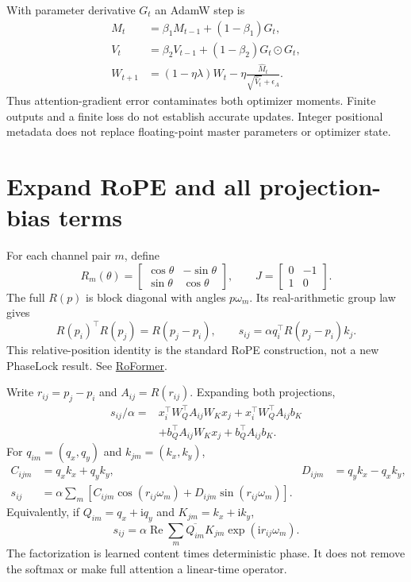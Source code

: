 \documentclass[11pt]{article}
\begin{document}
With parameter derivative $G_t$ an AdamW step is
\begin{align}
 M_t&=\beta_1 M_{t-1}+(1-\beta_1)G_t,\\
 V_t&=\beta_2 V_{t-1}+(1-\beta_2)G_t\odot G_t,\\
 W_{t+1}&=(1-\eta\lambda)W_t-
 \eta\frac{\widehat M_t}{\sqrt{\widehat V_t}+\epsilon_A}.
\end{align}
Thus attention-gradient error contaminates both optimizer moments. Finite outputs and a finite loss do not establish accurate updates. Integer positional metadata does not replace floating-point master parameters or optimizer state.

\section{Expand RoPE and all projection-bias terms}

For each channel pair $m$, define
\begin{equation}
 R_m(\theta)=\begin{bmatrix}\cos\theta&-\sin\theta\\\sin\theta&\cos\theta\end{bmatrix},
 \qquad J=\begin{bmatrix}0&-1\\1&0\end{bmatrix}.
\end{equation}
The full $R(p)$ is block diagonal with angles $p\omega_m$. Its real-arithmetic group law gives
\begin{equation}
 R(p_i)^\top R(p_j)=R(p_j-p_i),\qquad
 s_{ij}=\alpha q_i^\top R(p_j-p_i)k_j.
\end{equation}
This relative-position identity is the standard RoPE construction, not a new PhaseLock result. See \href{https://arxiv.org/html/2104.09864v5}{RoFormer}.

Write $r_{ij}=p_j-p_i$ and $A_{ij}=R(r_{ij})$. Expanding both projections,
\begin{align}
 s_{ij}/\alpha={}&x_i^\top W_Q^\top A_{ij}W_Kx_j
 +x_i^\top W_Q^\top A_{ij}b_K\\
 &+b_Q^\top A_{ij}W_Kx_j+b_Q^\top A_{ij}b_K.
\end{align}
For $q_{im}=(q_x,q_y)$ and $k_{jm}=(k_x,k_y)$,
\begin{align}
 C_{ijm}&=q_xk_x+q_yk_y,&D_{ijm}&=q_yk_x-q_xk_y,\\
 s_{ij}&=\alpha\sum_m\left[C_{ijm}\cos(r_{ij}\omega_m)
 +D_{ijm}\sin(r_{ij}\omega_m)\right].
\end{align}
Equivalently, if $Q_{im}=q_x+\mathrm i q_y$ and $K_{jm}=k_x+\mathrm i k_y$,
\begin{equation}
 s_{ij}=\alpha\operatorname{Re}\sum_m\overline{Q_{im}}K_{jm}
 \exp(\mathrm i r_{ij}\omega_m).
\end{equation}
The factorization is learned content times deterministic phase. It does not remove the softmax or make full attention a linear-time operator.
\end{document}
